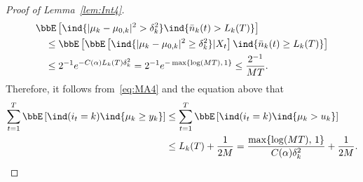 \documentclass[11pt]{article}
\begin{document}
\begin{proof}[Proof of Lemma~\ref{lem:Int4}]
\begin{align}
    \nonumber
    &\bbE\left[   \ind\{|\mu_k - \mu_{0,k}|^2>\delta_k^2  \}  \ind\{\bar n_k(t) > L_k(T)\} \right] \nonumber
    \\
    &\quad\leq \bbE\left[  \bbE\left[ \ind\{|\mu_k - \mu_{0,k}|^2\geq  \delta_k^2\} | X_{t} \right] \ind\{\bar n_k(t) \geq L_k(T)\}\right]
    \\
    &\quad\leq 2^{-1} e^{ - C(\alpha) L_k(T)\delta_k^2 } = 2^{-1} e^{-\max\{\log(MT),\,1\}} \leq \frac{2^{-1}}{MT}. \nonumber
    \end{align}
 Therefore, it follows from~\eqref{eq:MA4} and the equation above that 
\begin{align*}
    \sum_{t=1}^{T}\bbE\left[  \ind(i_t=k )  \ind\{\mu_k \geq y_k  \}   \right]  &\leq \sum_{t=1}^{T}\bbE\left[  \ind(i_t=k )  \ind\{\mu_k > u_k  \}   \right] 
    \\
    &\leq L_k(T)  + \frac{1}{2M} = \frac{\max\{\log(MT),\,1\}}{C(\alpha)\delta_k^2}  + \frac{1}{2M}.
\end{align*}
\end{proof}
\end{document}
